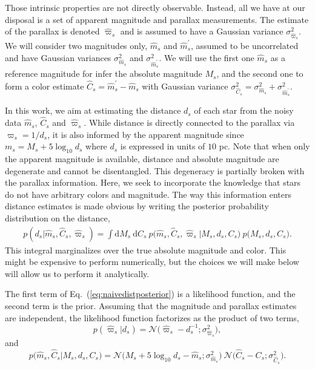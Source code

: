 \documentclass[manuscript, letterpaper]{aastex6}
\newcommand{\equref}[1]{{\xspace}Eq.~(\ref{#1})}
\renewcommand{\d}{{\mathrm{d}}}
\newcommand{\equ}[1]{\begin{equation}#1\end{equation}}
\newcommand{\eqn}[1]{\begin{eqnarray}#1\end{eqnarray}}
\begin{document}
Those intrinsic properties are not directly observable.
Instead, all we have at our disposal is a set of apparent magnitude and parallax measurements.  
The estimate of the parallax is denoted $\hat{\varpi}_s$ and is assumed to have a Gaussian variance $\sigma_{\hat{\varpi}_s}^2$.
We will consider two magnitudes only, $\hat{m}_s$ and $\hat{m}^\prime_s$, assumed to be  uncorrelated and have Gaussian variances $\sigma_{\hat{m}_s}^2$ and $\sigma_{\hat{m}^\prime_s}^2$.
We will use the first one $\hat{m}_s$ as a reference magnitude for infer the absolute magnitude $M_s$, and the second one to form a color estimate $\hat{C}_s =\hat{m}^\prime_s - \hat{m}_s $ with Gaussian variance $\sigma_{\hat{C}_s}^2 = \sigma_{\hat{m}_s}^2 + \sigma_{\hat{m}^\prime_s}^2$.

In this work, we aim at estimating the distance $d_s$ of each star from the noisy data $\hat{m}_s$,  $\hat{C}_s$ and $\hat{\varpi}_s$. 
While distance is directly connected to the parallax via $\varpi_s=1/d_s$, it is also informed by the apparent magnitude since $m_s = M_s + 5\log_{10} d_s$ where $d_s$ is expressed in units of $10$ pc.
Note that when only the apparent magnitude is available, distance and absolute magnitude are degenerate and cannot be disentangled. 
This degeneracy is partially broken with the parallax information.
Here, we seek to incorporate the knowledge that stars do not have arbitrary colors and magnitude.
The way this information enters distance estimates is made obvious by writing the posterior probability distribution on the distance,
\eqn{
	p(d_s | \hat{m}_s, \hat{C}_s, \hat{\varpi}_s) = \int \d M_s \ \d C_s \ p\bigl(\hat{m}_s, \hat{C}_s, \hat{\varpi}_s \bigr\rvert M_s, d_s, C_s\bigr) \ p\bigl( M_s, d_s, C_s \bigr) \label{eq:naivedistposterior}.
}
This integral marginalizes over the true absolute magnitude and color.
This might be expensive to perform numerically, but the choices we will make below will allow us to perform it analytically.

The first term of \equref{eq:naivedistposterior} is a likelihood function, and the second term is the prior. 
Assuming that the magnitude and parallax estimates are independent, the likelihood function factorizes as the product of two terms, 
\equ{
	p\left(\hat{\varpi}_s \bigr\rvert d_s\right) = \mathcal{N}\bigl(\hat{\varpi}_s - d_s^{-1};\sigma_{\hat{\varpi}_s}^2 \bigr),
}
and
\equ{
	p\bigl(\hat{m}_s, \hat{C}_s \bigr\rvert M_s, d_s, C_s\bigr)  =  \mathcal{N}\bigl( M_s + 5\log_{10}d_s  -\hat{m}_s ;\sigma_{\hat{m}_s}^2 \bigr) \  \mathcal{N}\bigl(\hat{C}_s - C_s;\sigma_{\hat{C}_s}^2 \bigr).
}
\end{document}
